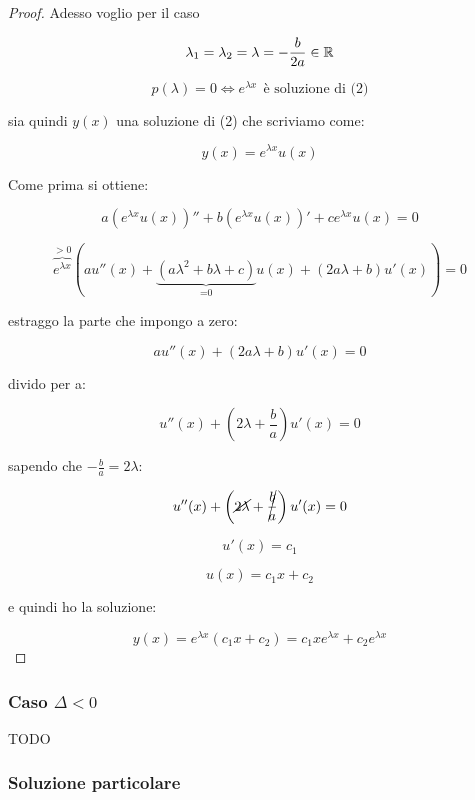\begin{proof}
    Adesso voglio per il caso 

    \[
        \lambda_1 = \lambda_2 = \lambda = -\frac{b}{2a} \in \mathbb{R}
    \]

    \[
        p(\lambda) =0 \iff e ^{\lambda x}\ \ \text{è soluzione di (2)}
    \]

    sia quindi \(y(x)\) una soluzione di (2) che scriviamo come:

    \[
        y(x) = e ^{\lambda x}u(x)
    \]

    Come prima si ottiene:

    \[
        a(e ^{\lambda x}u(x) )''+ b(e ^{\lambda x}u(x))' + c e ^{\lambda x}u(x)=0
    \]

    \[
        \overbrace{e ^{\lambda x}}^{>0}(a u''(x) + \underbrace{(a \lambda^{2}+b \lambda +c )}_\text{=0} u(x) + (2a \lambda+b)u'(x))=0
    \]

    estraggo la parte che impongo a zero:

    \[
        au''(x) + (2a \lambda+b)u'(x) = 0
    \]

    divido per a:

    \[
        u''(x) + \left( 2 \lambda + \frac{b}{a} \right)u'(x) = 0
    \]

    sapendo che \(-\frac{b}{a} = 2 \lambda \):

    \[
        u''(x) + \left( \cancel{2 \lambda} + \cancel{\frac{b}{a}} \right)u'(x) = 0
    \]


    \[
        u'(x) = c_1
    \]

    \[
        u(x) = c_1 x +c_2
    \]

    e quindi ho la soluzione:

    \[
        y(x) = e ^{\lambda x}(c_1x+c_2) = c_1x e^{\lambda x}+ c_2 e ^{\lambda x}
    \]
\end{proof}

\filbreak{}

\subsubsection*{Caso \(\Delta < 0\)}

TODO

\filbreak{}

\subsubsection{Soluzione particolare}

